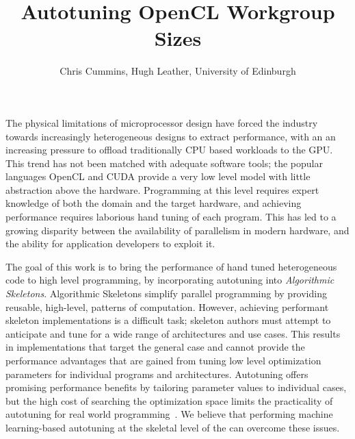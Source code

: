 \documentclass[times, 10pt,twocolumn]{article}
\begin{document}
\title{
\vspace{-0.8in}
Autotuning OpenCL Workgroup Sizes
\vspace{-0.2in}
}
\author{Chris Cummins, Hugh Leather, University of Edinburgh
}

\vspace{-3em}
\maketitle
\vspace{-3em}
\thispagestyle{empty}

The physical limitations of microprocessor design have forced the
industry towards increasingly heterogeneous designs to extract
performance, with an an increasing pressure to offload traditionally
CPU based workloads to the GPU. This trend has not been matched with
adequate software tools; the popular languages OpenCL and CUDA provide
a very low level model with little abstraction above the
hardware. Programming at this level requires expert knowledge of both
the domain and the target hardware, and achieving performance requires
laborious hand tuning of each program. This has led to a growing
disparity between the availability of parallelism in modern hardware,
and the ability for application developers to exploit it.

The goal of this work is to bring the performance of hand tuned
heterogeneous code to high level programming, by incorporating
autotuning into \textit{Algorithmic Skeletons}. Algorithmic Skeletons
simplify parallel programming by providing reusable, high-level,
patterns of computation. However, achieving performant skeleton
implementations is a difficult task; skeleton authors must attempt to
anticipate and tune for a wide range of architectures and use
cases. This results in implementations that target the general case
and cannot provide the performance advantages that are gained from
tuning low level optimization parameters for individual programs and
architectures. Autotuning offers promising performance benefits by
tailoring parameter values to individual cases, but the high cost of
searching the optimization space limits the practicality of autotuning
for real world programming~\cite{Ansel2013,Nugteren2015}. We believe
that performing machine learning-based autotuning at the skeletal
level of the can overcome these issues.
\end{document}
